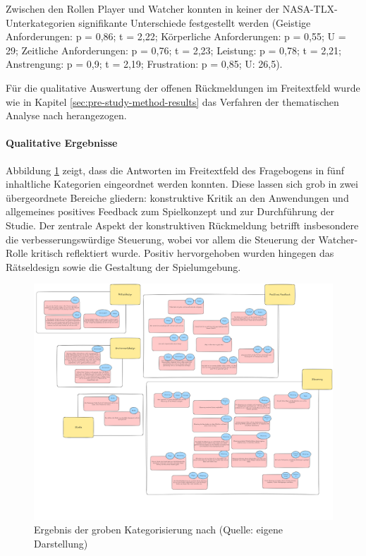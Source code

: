 Zwischen den Rollen Player und Watcher konnten in keiner der \ac{NASA-TLX}-Unterkategorien signifikante Unterschiede festgestellt werden (Geistige Anforderungen: p = 0,86; t = 2,22; Körperliche Anforderungen: p = 0,55; U = 29; Zeitliche Anforderungen: p = 0,76; t = 2,23; Leistung: p = 0,78; t = 2,21; Anstrengung: p = 0,9; t = 2,19; Frustration: p = 0,85; U: 26,5).

Für die qualitative Auswertung der offenen Rückmeldungen im Freitextfeld  wurde wie in Kapitel \ref{sec:pre-study-method-results} das Verfahren der thematischen Analyse nach \cite{braun_using_2006} herangezogen.

\paragraph{Qualitative Ergebnisse}

Abbildung \ref{fig:qualitative-results} zeigt, dass die Antworten im Freitextfeld des Fragebogens in fünf inhaltliche Kategorien eingeordnet werden konnten. Diese lassen sich grob in zwei übergeordnete Bereiche gliedern: konstruktive Kritik an den Anwendungen und allgemeines positives Feedback zum Spielkonzept und zur Durchführung der Studie. Der zentrale Aspekt der konstruktiven Rückmeldung betrifft insbesondere die verbesserungswürdige Steuerung, wobei vor allem die Steuerung der Watcher-Rolle kritisch reflektiert wurde. Positiv hervorgehoben wurden hingegen das Rätseldesign sowie die Gestaltung der Spielumgebung.

\begin{figure}[ht]
\centering
\includegraphics[width=1\linewidth]{content/pictures/Qualitative-Auswertung-Schritt-1.png}
\caption{Ergebnis der groben Kategorisierung nach \cite{braun_using_2006} (Quelle: eigene Darstellung)}
\label{fig:qualitative-results}
\end{figure}

